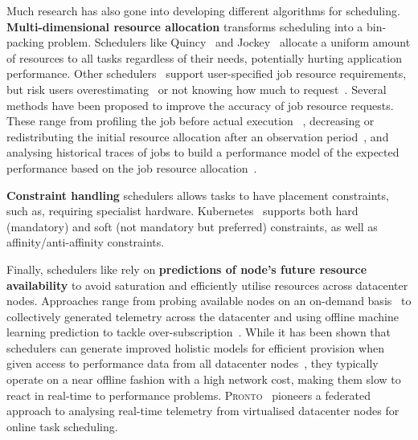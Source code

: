Much research has also gone into developing different algorithms for
scheduling.\\
\textbf{Multi-dimensional resource allocation} transforms scheduling into a
bin-packing problem. Schedulers like Quincy~\cite{isard2009quincy} and Jockey~\cite{ferguson2012jockey}
allocate a uniform amount of resources to all tasks regardless of their needs,
potentially hurting application performance. Other schedulers~\cite{verma2015large, delimitrou2014quasar,
hindman2011mesos} support user-specified job resource requirements, but risk users
overestimating~\cite{gog2018flexible} or not knowing how much to request~\cite{mogul2015inferring}.
Several methods have been proposed to improve the accuracy of job resource
requests. These range from profiling the job before actual execution~\cite{delimitrou2014quasar}
, decreasing or redistributing the initial resource allocation after an
observation period~\cite{verma2015large,grandl2016altruistic}, and analysing historical traces of jobs to
build a performance model of the expected performance based on the job resource
    allocation~\cite{ferguson2012jockey, venkataraman2016ernest, peng2018optimus}.

\textbf{Constraint handling} schedulers allows tasks to have placement
constraints, such as, requiring specialist hardware. Kubernetes~\cite{kube-constraints}
supports both hard (mandatory) and soft (not mandatory but preferred)
constraints, as well as affinity/anti-affinity constraints.


Finally, schedulers like \cite{boutin2014apollo, karanasos2015mercury, verma2015large,
gog_firmament_2016, mao2019learning, ousterhout2013sparrow}
rely on \textbf{predictions of node's future resource
availability} to avoid saturation and efficiently utilise resources across
datacenter nodes. Approaches range from probing available nodes on an on-demand
basis~\cite{ousterhout2013sparrow,verma2015large} to collectively
generated telemetry across the datacenter and using offline machine learning
prediction to tackle over-subscription~\cite{cortez2017resource}. While it has
been shown that schedulers can generate improved holistic models for efficient
provision when given access to performance data from all datacenter
nodes~\cite{verma2015large, gog_firmament_2016, boutin2014apollo,
mao2019learning, cortez2017resource}, they typically operate on a near offline
fashion with a high network cost, making them slow to react in real-time to
performance problems. \textsc{Pronto}~\cite{grammenos_pronto_2021} pioneers
a federated approach to analysing real-time telemetry from virtualised
datacenter nodes for online task scheduling.


